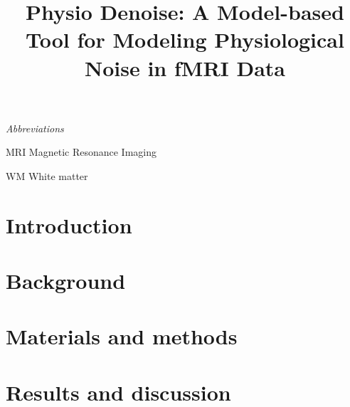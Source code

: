 \documentclass[conference]{IEEEtran}
\newcommand{\abbrlabel}[1]{\makebox[2cm][l]{\textbf{#1}\ \dotfill}}
\newenvironment{abbreviations}{\begin{list}{}{\renewcommand{\makelabel}{\abbrlabel}}}{\end{list}}
\begin{document}
\title{Physio Denoise: A Model-based Tool for Modeling Physiological Noise in fMRI Data\\}

\author{}

\maketitle

%


\textit{Abbreviations}
\begin{abbreviations}
\item[MRI] Magnetic Resonance Imaging
\item[WM] White matter
\end{abbreviations}

\section{Introduction}\label{sec:Introduction}


\section{Background}\label{sec:Background}


\section{Materials and methods}\label{sec:Methods}


\section{Results and discussion}\label{sec:Results_And_Discussion}



%
\end{document}
